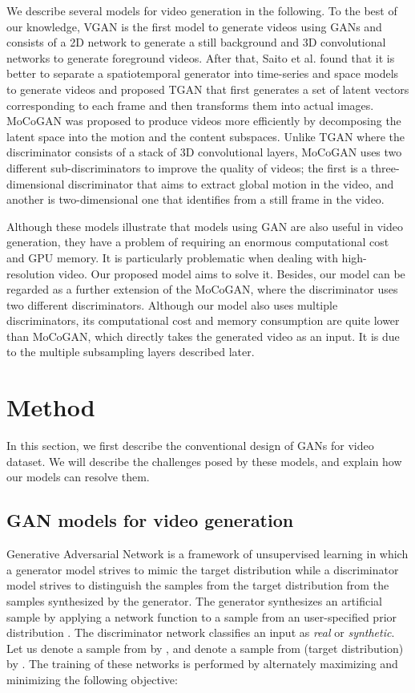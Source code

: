 \documentclass[twocolumn]{svjour3}
\begin{document}
We describe several models for video generation in the following.
To the best of our knowledge, VGAN \cite{Vondrick2016} is the first model to generate videos using GANs and consists of a 2D network to generate a still background and 3D convolutional networks to generate foreground videos.
After that, Saito et al. \cite{Saito2017} found that it is better to separate a spatiotemporal generator into time-series and space models to generate videos and proposed TGAN that first generates a set of latent vectors corresponding to each frame and then transforms them into actual images.
MoCoGAN \cite{Tulyakov2018} was proposed to produce videos more efficiently by decomposing the latent space into the motion and the content subspaces.
Unlike TGAN where the discriminator consists of a stack of 3D convolutional layers, MoCoGAN uses two different sub-discriminators to improve the quality of videos; the first is a three-dimensional discriminator that aims to extract global motion in the video, and another is two-dimensional one that identifies from a still frame in the video.

Although these models illustrate that models using GAN are also useful in video generation, they have a problem of requiring an enormous computational cost and GPU memory. It is particularly problematic when dealing with high-resolution video. Our proposed model aims to solve it.
Besides, our model can be regarded as a further extension of the MoCoGAN, where the discriminator uses two different discriminators.
Although our model also uses multiple discriminators, its computational cost and memory consumption are quite lower than MoCoGAN, which directly takes the generated video as an input. It is due to the multiple subsampling layers described later.


\section{Method}

In this section, we first describe the conventional design of GANs for video dataset.
We will describe the challenges posed by these models, and explain how our models can resolve them.

\subsection{GAN models for video generation}
Generative Adversarial Network is a framework of unsupervised learning in which a generator model strives to mimic the target distribution while a discriminator model strives to distinguish the samples from the target distribution from the samples synthesized by the generator.
The generator synthesizes an artificial sample by applying a network function  to a sample from an user-specified prior distribution .
The discriminator network  classifies an input as \textit{real} or \textit{synthetic}.
Let us denote a sample from  by , and denote a sample from  (target distribution) by .
The training of these networks is performed by
alternately maximizing and minimizing the following objective:
\end{document}
